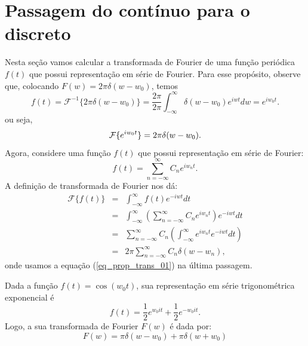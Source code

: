     
\section{Passagem do contínuo para o discreto}
Nesta seção vamos calcular a transformada de Fourier de uma função periódica $f(t)$ que possui representação em série de Fourier. Para esse propósito, observe que, colocando $F(w)=2\pi \delta(w-w_0)$, temos 
\begin{equation*}
f(t)=\mathcal{F}^{-1}\{2\pi\delta(w-w_0)\}=\frac{2\pi}{2\pi}\int_{-\infty}^\infty \delta(w-w_0)e^{iwt}dw=e^{iw_0t}.
\end{equation*}
ou seja,
\begin{equation}{\label{eq_prop_trans_01}}
\mathcal{F}\{e^{iw_0t}\}=2\pi\delta(w-w_0).
\end{equation}
Agora, considere uma função $f(t)$ que possui representação em série de Fourier:
\begin{equation}
f(t)=\sum_{n=-\infty}^\infty C_n e^{iw_nt}.
\end{equation}
A definição de transformada de Fourier nos dá:
\begin{eqnarray*}
\mathcal{F}\{f(t)\}&=&\int_{-\infty}^\infty f(t) e^{-iwt}dt\\
&=&\int_{-\infty}^\infty\left( \sum_{n=-\infty}^\infty C_n e^{iw_nt}\right) e^{-iwt}dt\\
&=& \sum_{n=-\infty}^\infty C_n \left(\int_{-\infty}^\infty e^{iw_nt}e^{-iwt} dt \right)\\
&=&2\pi \sum_{n=-\infty}^\infty C_n \delta(w-w_n) ,
\end{eqnarray*}
onde usamos a equação (\ref{eq_prop_trans_01}) na última passagem.
\begin{ex}{\label{ex_ant}} Dada a função $f(t)=\cos(w_0t)$, sua representação em série trigonométrica exponencial é
\begin{equation}
f(t)=\frac{1}{2}e^{w_0it}+\frac{1}{2}e^{-w_0it}.
\end{equation}
Logo, a sua transformada de Fourier $F(w)$ é dada por:
\begin{equation}
F(w)=\pi\delta(w-w_0)+\pi\delta(w+w_0)
\end{equation}
\end{ex}
